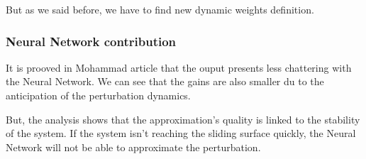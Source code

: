 But as we said before, we have to find new dynamic weights definition.

\subsubsection{Neural Network contribution}

It is prooved in Mohammad article that the ouput presents less chattering with the Neural Network. %
We can see that the gains are also smaller du to the anticipation of the perturbation dynamics. %

But, the analysis shows that the approximation's  quality is linked to the stability of the system. %
If the system isn't reaching the sliding surface quickly, the Neural Network will not be able to %
approximate the perturbation. %



\newpage